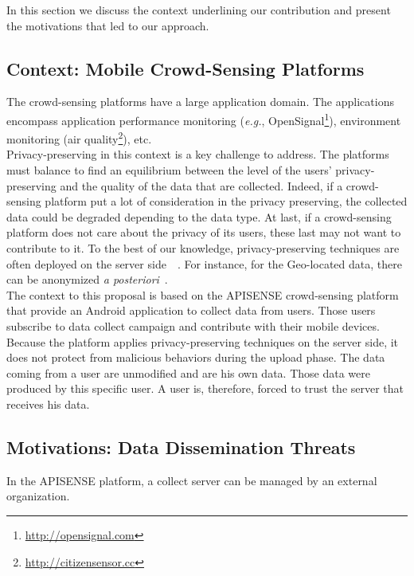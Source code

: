 

In this section we discuss the context underlining our contribution and present the motivations that led to our approach.

\subsection{Context: Mobile Crowd-Sensing Platforms}

The crowd-sensing platforms have a large application domain.
The applications encompass application performance monitoring (\emph{e.g.}, OpenSignal\footnote{\url{http://opensignal.com}}), environment monitoring (air quality\footnote{\url{http://citizensensor.cc}}), etc.
\\

Privacy-preserving in this context is a key challenge to address.
The platforms must balance to find an equilibrium between the level of the users' privacy-preserving and the quality of the data that are collected.
Indeed, if a crowd-sensing platform put a lot of consideration in the privacy preserving, the collected data could be degraded depending to the data type.
At last, if a crowd-sensing platform does not care about the privacy of its users, these last may not want to contribute to it.
To the best of our knowledge, privacy-preserving techniques are often deployed on the server side~\cite{DBLP:conf/mobisys/CorneliusKKPST08}~\cite{DBLP:conf/dais/HadererRS13}.
For instance, for the Geo-located data, there can be anonymized \emph{a posteriori}~\cite{DBLP:conf/icdcs/PrimaultMB15}.
\\

The context to this proposal is based on the APISENSE crowd-sensing platform that provide an Android application to collect data from users.
Those users subscribe to data collect campaign and contribute with their mobile devices.
Because the platform applies privacy-preserving techniques on the server side, it does not protect from malicious behaviors during the upload phase.
The data coming from a user are unmodified and are his own data.
Those data were produced by this specific user.
A user is, therefore, forced to trust the server that receives his data.

\subsection{Motivations: Data Dissemination Threats}

In the APISENSE platform, a collect server can be managed by an external organization.
\\

